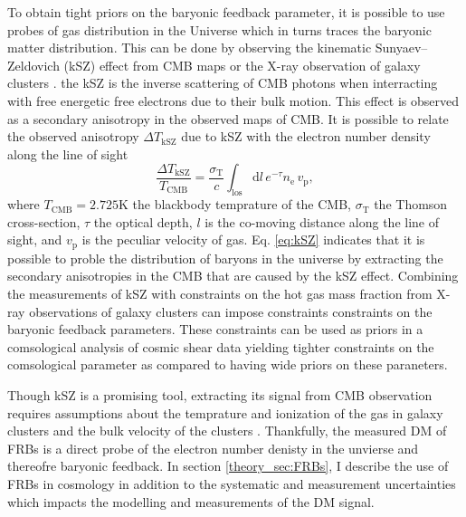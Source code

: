 To obtain tight priors on the baryonic feedback parameter, it is possible to use probes of gas distribution in the Universe which in turns traces the baryonic matter distribution. This can be done by observing the kinematic Sunyaev–Zeldovich (kSZ) effect from CMB maps \citep{sunyaev1972observations, liu2025measurements} or the X-ray observation of galaxy clusters . the kSZ is the inverse scattering of CMB photons when interracting with free energetic free electrons due to their bulk motion. This effect is observed as a secondary anisotropy in the observed maps of CMB. It is possible to relate the observed anisotropy $\Delta T_{\mathrm{kSZ}}$ due to kSZ with the electron number density along the line of sight 
\begin{equation}\label{eq:kSZ}
    \frac{\Delta T_{\mathrm{kSZ}}}{T_{\mathrm{CMB}}} = \frac{\sigma_{\mathrm{T}}}{c} \int_{\mathrm{los}} \mathrm{d}l \, e^{-\tau} n_{\mathrm{e}} \, v_{\mathrm{p}},
\end{equation}
where $T_{\mathrm{CMB}} = 2.725 \text{K}$ the blackbody temprature of the CMB, $\sigma_{\mathrm{T}}$ the Thomson cross-section, $\tau$ the optical depth, $l$ is the co-moving distance along the line of sight, and $v_{\mathrm{p}}$ is the peculiar velocity of gas. Eq. \ref{eq:kSZ} indicates that it is possible to proble the distribution of baryons in the universe by extracting the secondary anisotropies in the CMB that are caused by the kSZ effect. Combining the measurements of kSZ with constraints on the hot gas mass fraction from X-ray observations of galaxy clusters can impose constraints constraints on the baryonic feedback parameters. These constraints can be used as priors in a comsological analysis of cosmic shear data yielding tighter constraints on the comsological parameter as compared to having wide priors on these paraneters. 

Though kSZ is a promising tool, extracting its signal from CMB observation requires assumptions about the temprature and ionization of the gas in galaxy clusters and the bulk velocity of the clusters \citep{carlstrom2002cosmology}. Thankfully, the measured DM of FRBs is a direct probe of the electron number denisty in the unvierse and thereofre baryonic feedback. In section \ref{theory_sec:FRBs}, I describe the use of FRBs in cosmology in addition to the systematic and measurement uncertainties which impacts the modelling and measurements of the DM signal.





